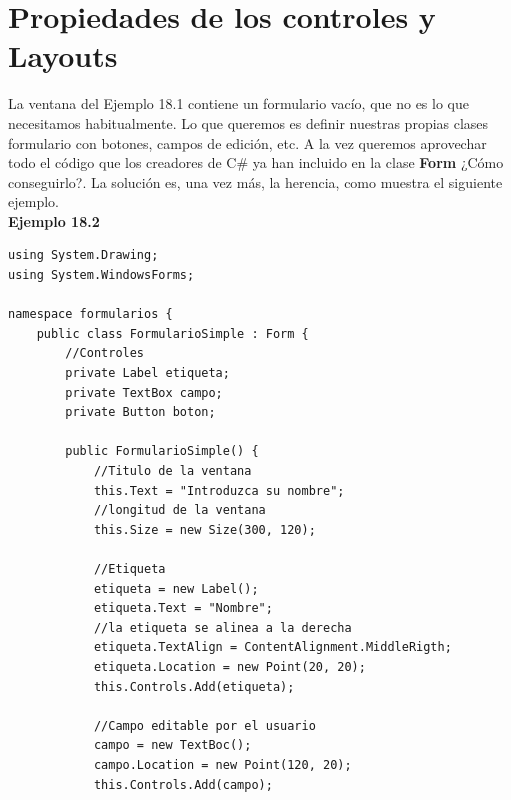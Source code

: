\documentclass[12pt,a4paper]{report}
\begin{document}
\section{Propiedades de los controles y Layouts}
La ventana del Ejemplo 18.1 contiene un formulario vacío, que no es lo que necesitamos habitualmente. Lo que queremos es definir nuestras propias clases formulario con botones, campos de edición, etc. A la vez queremos aprovechar todo el código que los creadores de C\# ya han incluido en la clase \textbf{Form} ¿Cómo conseguirlo?. La solución es, una vez más, la herencia, como muestra el siguiente ejemplo.\\\textbf{Ejemplo 18.2}
\begin{lstlisting}
using System.Drawing;
using System.WindowsForms;

namespace formularios {
	public class FormularioSimple : Form {
		//Controles
		private Label etiqueta;
		private TextBox campo;
		private Button boton;
		
		public FormularioSimple() {
			//Titulo de la ventana
			this.Text = "Introduzca su nombre";
			//longitud de la ventana
			this.Size = new Size(300, 120);
			
			//Etiqueta
			etiqueta = new Label();
			etiqueta.Text = "Nombre";
			//la etiqueta se alinea a la derecha
			etiqueta.TextAlign = ContentAlignment.MiddleRigth;
			etiqueta.Location = new Point(20, 20);
			this.Controls.Add(etiqueta);
			
			//Campo editable por el usuario
			campo = new TextBoc();
			campo.Location = new Point(120, 20);
			this.Controls.Add(campo);
			

\end{lstlisting}
\end{document}
